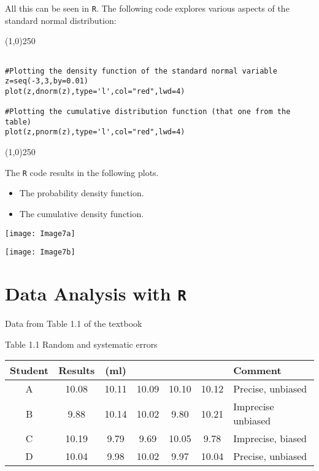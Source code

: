 All this can be seen in \texttt{R}. The following code explores various aspects of the standard normal distribution:
\begin{center}
	\line(1,0){250}
\end{center}
\begin{verbatim}

#Plotting the density function of the standard normal variable
z=seq(-3,3,by=0.01)
plot(z,dnorm(z),type='l',col="red",lwd=4)

#Plotting the cumulative distribution function (that one from the table)
plot(z,pnorm(z),type='l',col="red",lwd=4)

\end{verbatim}
\begin{center}
	\line(1,0){250}
\end{center}
\newpage
The \texttt{R} code results in the following plots.
\begin{itemize}
	\item The probability density function.
	\item The cumulative density function.
\end{itemize}
\begin{center}
	\texttt{[image: Image7a]}
\end{center}
\begin{center}
	\texttt{[image: Image7b]}
\end{center}
\newpage

\section{Data Analysis with \texttt{R}}

Data from Table 1.1 of the textbook

Table 1.1 Random and systematic errors

\begin{tabular}{|c|ccccc|l|}
	\hline
	Student & Results  & (ml) &  &  &  &Comment \\ \hline
	A & 10.08 & 10.11 &10.09 &10.10&10.12 & Precise, unbiased\\ \hline
	B & 9.88 &10.14& 10.02 &9.80& 10.21& Imprecise unbiased\\ \hline
	C & 10.19 &9.79& 9.69 &10.05& 9.78 & Imprecise, biased\\ \hline
	D & 10.04 &9.98 &10.02 &9.97 &10.04 & Precise, unbiased \\
	\hline
\end{tabular}
\bigskip

